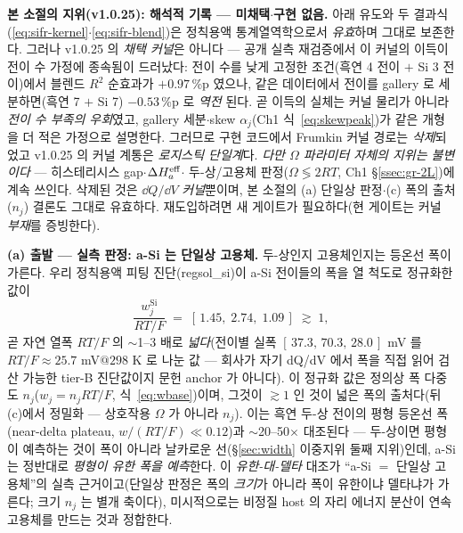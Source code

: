 \begin{warnbox}
\textbf{본 소절의 지위(v1.0.25): 해석적 기록 --- 미채택$\cdot$구현 없음.} 아래 유도와 두 결과식
(\eqref{eq:sifr-kernel}$\cdot$\eqref{eq:sifr-blend})은 정칙용액 통계열역학으로서 \emph{유효}하며 그대로
보존한다. 그러나 v1.0.25 의 \emph{채택 커널}은 아니다 --- 공개 실측 재검증에서 이 커널의 이득이 전이 수
가정에 종속됨이 드러났다: 전이 수를 낮게 고정한 조건(흑연 4 전이 $+$ Si 3 전이)에서 블렌드 $R^2$ 순효과가
$+0.97$\,\%p 였으나, 같은 데이터에서 전이를 gallery 로 세분하면(흑연 7 $+$ Si 7) $-0.53$\,\%p 로 \emph{역전}
된다. 곧 이득의 실체는 커널 물리가 아니라 \emph{전이 수 부족의 우회}였고, gallery 세분$\cdot$skew
$\alpha_j$(Ch1 식~\eqref{eq:skewpeak})가 같은 개형을 더 적은 가정으로 설명한다. 그러므로 구현 코드에서
Frumkin 커널 경로는 \emph{삭제}되었고 v1.0.25 의 커널 계통은 \emph{로지스틱 단일계}다.
\emph{다만 $\Omega$ 파라미터 자체의 지위는 불변이다} --- 히스테리시스 gap$\cdot$$\Delta H_a^{\mathrm{eff}}$$\cdot$
두-상/고용체 판정($\Omega\lessgtr2RT$, Ch1 \S\ref{ssec:gr-2L})에 계속 쓰인다. 삭제된 것은 $\dd Q/\dd V$
\emph{커널}뿐이며, 본 소절의 (a) 단일상 판정$\cdot$(c) 폭의 출처($n_j$) 결론도 그대로 유효하다.
재도입하려면 새 게이트가 필요하다(현 게이트는 커널 \emph{부재}를 증빙한다).
\end{warnbox}

\textbf{(a) 출발 --- 실측 판정: a-Si 는 단일상 고용체.} 두-상인지 고용체인지는 등온선 폭이 가른다. 우리 정칙용액
피팅 진단(regsol\_si)이 a-Si 전이들의 폭을 열 척도로 정규화한 값이
\begin{equation}
\frac{w_j^{\mathrm{Si}}}{RT/F}\;=\;[\,1.45,\;2.74,\;1.09\,]\;\gtrsim\;1,
\label{eq:sifr-width}
\end{equation}
곧 자연 열폭 $RT/F$ 의 $\sim$1--3 배로 \emph{넓다}(전이별 실폭 $[\,37.3,\,70.3,\,28.0\,]$ mV 를
$RT/F\!\approx\!25.7$ mV$@298$ K 로 나눈 값 --- 회사가 자기 dQ/dV 에서 폭을 직접 읽어 검산 가능한
tier-B 진단값이지 문헌 anchor 가 아니다). 이 정규화 값은 정의상 폭 다중도 $n_j$($w_j{=}n_jRT/F$,
식~\eqref{eq:wbase})이며, 그것이 $\gtrsim1$ 인 것이 넓은 폭의 출처다(뒤 (c)에서 정밀화 --- 상호작용 $\Omega$ 가
아니라 $n_j$). 이는 흑연 두-상 전이의 평형 등온선 폭(near-delta plateau, $w/(RT/F)\!\ll\!0.12$)과 $\sim$20--50$\times$
대조된다 --- 두-상이면 평형이 예측하는 것이 폭이 아니라 날카로운 선(\S\ref{sec:width} 이중지위 둘째 지위)인데,
a-Si 는 정반대로 \emph{평형이 유한 폭을 예측}한다. 이 \emph{유한-대-델타} 대조가 ``a-Si $=$ 단일상 고용체''의
실측 근거이고(단일상 판정은 폭의 \emph{크기}가 아니라 폭이 유한이냐 델타냐가 가른다; 크기 $n_j$ 는 별개 축이다),
미시적으로는 비정질 host 의 자리 에너지 분산이 연속 고용체를 만드는 것과 정합한다\cite{chevrier_dahn2009,artrith2018}.

